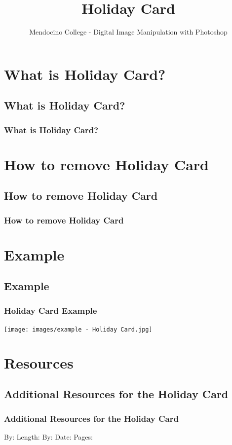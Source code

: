 \documentclass{beamer}
\title{Holiday Card}
\author{Mendocino College - Digital Image Manipulation with Photoshop}
\date{\vspace{-5em}}
\begin{document}
	{
		\begin{frame}
			\vspace{-35pt}
			\maketitle
		\end{frame}
	}
		
		
\section{What is Holiday Card?}

\subsection{What is Holiday Card?}		

	\begin{frame}
		\frametitle{What is Holiday Card?}
		\begin{outline}
			\1 
		\end{outline}
	\end{frame}

\section{How to remove Holiday Card}
\subsection{How to remove Holiday Card}
	\begin{frame}
	\frametitle{How to remove Holiday Card}
	\begin{outline}
		\1 
	\end{outline}
\end{frame}

\section{Example}

\subsection{Example}		
	\begin{frame}
		\frametitle{Holiday Card Example}
		\begin{center}
			\texttt{[image: images/example - Holiday Card.jpg]}
		\end{center}
	\end{frame}

\section{Resources}
\subsection{Additional Resources for the Holiday Card}		
	\begin{frame}
		\frametitle{Additional Resources for the Holiday Card}
		\begin{outline}
			\1 
			\2  By:  
			\2  Length:
			\2 
			\1 
			\2  By:    
			\2  Date:  
			\2  Pages: 
			\2 
		\end{outline}
	\end{frame}

	
\end{document}
